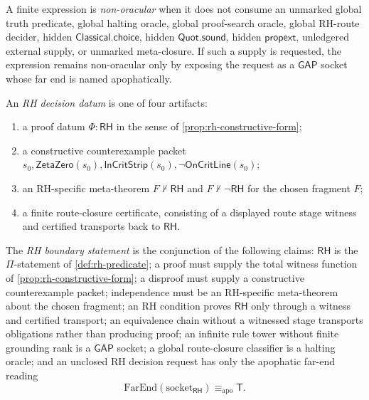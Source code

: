 \begin{definition}
\label{def:rh-non-oracular-expression}
A finite expression is \emph{non-oracular} when it does not consume an
unmarked global truth predicate, global halting oracle, global proof-search
oracle, global RH-route decider, hidden $\mathsf{Classical.choice}$,
hidden $\mathsf{Quot.sound}$, hidden $\mathsf{propext}$, unledgered
external supply, or unmarked meta-closure.  If such a supply is requested,
the expression remains non-oracular only by exposing the request as a
$\mathsf{GAP}$ socket whose far end is named apophatically.
\end{definition}

\begin{definition}
\label{def:rh-decision-datum}
An \emph{RH decision datum} is one of four artifacts:
\begin{enumerate}
\item a proof datum $\Phi:\mathsf{RH}$ in the sense of
  \autoref{prop:rh-constructive-form};
\item a constructive counterexample packet
  $s_0,\mathsf{ZetaZero}(s_0),\mathsf{InCritStrip}(s_0),
  \neg\mathsf{OnCritLine}(s_0)$;
\item an RH-specific meta-theorem
  $F\not\vdash\mathsf{RH}$ and $F\not\vdash\neg\mathsf{RH}$ for the
  chosen fragment $F$;
\item a finite route-closure certificate, consisting of a displayed route
  stage witness and certified transports back to $\mathsf{RH}$.
\end{enumerate}
\end{definition}

\begin{definition}
\label{def:rh-boundary-statement}
The \emph{RH boundary statement} is the conjunction of the following
claims: $\mathsf{RH}$ is the $\Pi$-statement of
\autoref{def:rh-predicate}; a proof must supply the total witness function
of \autoref{prop:rh-constructive-form}; a disproof must supply a
constructive counterexample packet; independence must be an RH-specific
meta-theorem about the chosen fragment; an RH condition proves
$\mathsf{RH}$ only through a witness and certified transport; an
equivalence chain without a witnessed stage transports obligations rather
than producing proof; an infinite rule tower without finite grounding rank
is a $\mathsf{GAP}$ socket; a global route-closure classifier is a halting
oracle; and an unclosed RH decision request has only the apophatic far-end
reading
$$
\mathrm{FarEnd}(\mathrm{socket}_{\mathsf{RH}})
\equiv_{\mathrm{apo}} \mathsf{T}.
$$
\end{definition}

